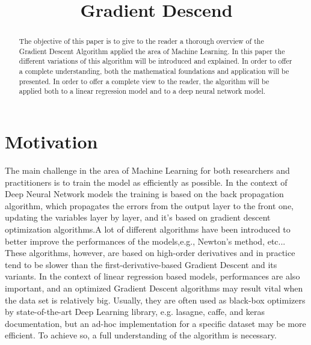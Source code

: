 \documentclass[conference]{IEEEtran}
\begin{document}
\title{Gradient Descend\\}

\author{
}

\maketitle


\begin{abstract}
The objective of this paper is to give to the reader a thorough overview of the Gradient Descent Algorithm applied the area of Machine Learning. In this paper the different variations of this algorithm will be introduced and explained. In order to offer a complete understanding, both the mathematical foundations and application will be presented. 
In order to offer a complete view to the reader, the algorithm will be applied both to a linear regression model and to a deep neural network model. 
\end{abstract}


\section{Motivation}
The main challenge in the area of Machine Learning for both researchers and practitioners is to train the model as efficiently as possible. In the context of Deep Neural Network models the training is based on the back propagation algorithm, which propagates the errors from the output layer to the front one, updating the variables layer by layer, and it's based on gradient descent optimization algorithms.A lot of different algorithms have been introduced to better improve the performances of the models,e.g., Newton’s method, etc... These algorithms, however, are based on high-order derivatives and in practice tend to be slower than the first-derivative-based Gradient Descent and its variants. 
In the context of linear regression based models, performances are also important, and an optimized Gradient Descent algorithms may result vital when the data set is relatively big. Usually, they are often used as black-box optimizers by state-of-the-art Deep Learning library, e.g. lasagne, caffe, and keras documentation, but an ad-hoc implementation for a specific dataset may be more efficient. To achieve so, a full understanding of the algorithm is necessary. 
\end{document}
